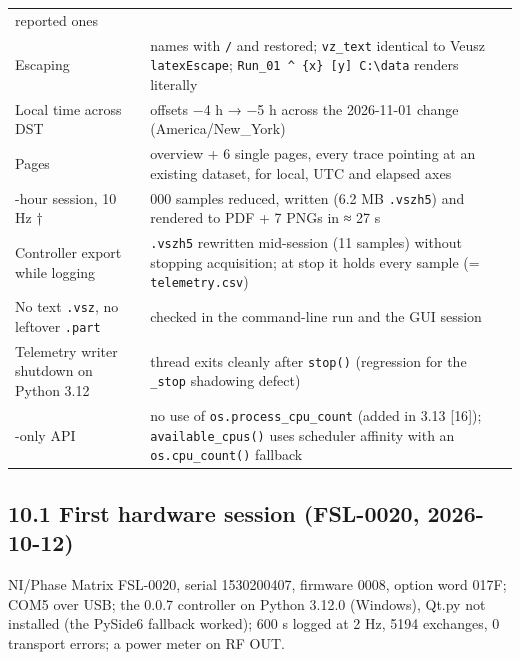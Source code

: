 \documentclass[
\directlua{luaotfload.add_fallback("qsfallback", {"DejaVu Sans:mode=harf;", "DejaVu Sans Mono:mode=harf;", "DejaVu Math TeX Gyre:mode=harf;"})}
  10pt,
  letterpaper,
]{article}
\begin{document}
\begin{longtable}[]{@{}
  >{\raggedright\arraybackslash}p{}
  >{\raggedright\arraybackslash}p{}@{}}
reported ones \\
Escaping & names with \texttt{/} and \texttt{\textasciigrave{}}
restored; \texttt{vz\_text} identical to Veusz \texttt{latexEscape};
\texttt{Run\_01\ \^{}\ \{x\}\ {[}y{]}\ C:\textbackslash{}data} renders
literally \\
Local time across DST & offsets −4 h → −5 h across the 2026-11-01 change
(America/New\_York) \\
Pages & overview + 6 single pages, every trace pointing at an existing
dataset, for local, UTC and elapsed axes \\
8-hour session, 10 Hz † & 288 000 samples reduced, written (6.2 MB
\texttt{.vszh5}) and rendered to PDF + 7 PNGs in ≈ 27 s \\
Controller export while logging & \texttt{.vszh5} rewritten mid-session
(11 samples) without stopping acquisition; at stop it holds every sample
(= \texttt{telemetry.csv}) \\
No text \texttt{.vsz}, no leftover \texttt{.part} & checked in the
command-line run and the GUI session \\
Telemetry writer shutdown on Python 3.12 & thread exits cleanly after
\texttt{stop()} (regression for the \texttt{\_stop} shadowing defect) \\
3.13-only API & no use of \texttt{os.process\_cpu\_count} (added in 3.13
{[}16{]}); \texttt{available\_cpus()} uses scheduler affinity with an
\texttt{os.cpu\_count()} fallback \\
\end{longtable}

\hypertarget{first-hardware-session-fsl-0020-2026-10-12}{%
\subsection{10.1 First hardware session (FSL-0020,
2026-10-12)}\label{first-hardware-session-fsl-0020-2026-10-12}}

NI/Phase Matrix FSL-0020, serial 1530200407, firmware 0008, option word
017F; COM5 over USB; the 0.0.7 controller on Python 3.12.0 (Windows),
Qt.py not installed (the PySide6 fallback worked); 600 s logged at 2 Hz,
5194 exchanges, 0 transport errors; a power meter on RF OUT.
\end{document}

